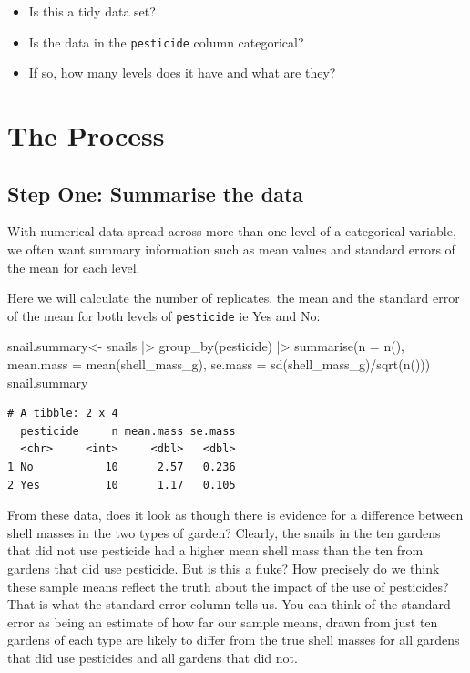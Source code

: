 \documentclass[
  letterpaper,
  DIV=11,
  numbers=noendperiod]{scrreprt}
\newenvironment{Shaded}{\begin{snugshade}}{\end{snugshade}}
\newcommand{\AttributeTok}[1]{\textcolor[rgb]{0.40,0.45,0.13}{#1}}
\newcommand{\FunctionTok}[1]{\textcolor[rgb]{0.28,0.35,0.67}{#1}}
\newcommand{\NormalTok}[1]{\textcolor[rgb]{0.00,0.23,0.31}{#1}}
\newcommand{\OtherTok}[1]{\textcolor[rgb]{0.00,0.23,0.31}{#1}}
\newcommand{\SpecialCharTok}[1]{\textcolor[rgb]{0.37,0.37,0.37}{#1}}
\providecommand{\tightlist}{%
  \setlength{\itemsep}{0pt}\setlength{\parskip}{0pt}}\usepackage{longtable,booktabs,array}
\begin{document}
\begin{itemize}
\tightlist
\item
  Is this a tidy data set?
\item
  Is the data in the \texttt{pesticide} column categorical?
\item
  If so, how many levels does it have and what are they?
\end{itemize}

\section{The Process}\label{the-process}

\subsection{Step One: Summarise the
data}\label{step-one-summarise-the-data}

With numerical data spread across more than one level of a categorical
variable, we often want summary information such as mean values and
standard errors of the mean for each level.

Here we will calculate the number of replicates, the mean and the
standard error of the mean for both levels of \texttt{pesticide} ie Yes
and No:

\begin{Shaded}
\begin{Highlighting}[]
\NormalTok{snail.summary}\OtherTok{\textless{}{-}}\NormalTok{ snails }\SpecialCharTok{|\textgreater{}}
\FunctionTok{group\_by}\NormalTok{(pesticide) }\SpecialCharTok{|\textgreater{}}
\FunctionTok{summarise}\NormalTok{(}\AttributeTok{n =} \FunctionTok{n}\NormalTok{(),}
          \AttributeTok{mean.mass =} \FunctionTok{mean}\NormalTok{(shell\_mass\_g),}
          \AttributeTok{se.mass =} \FunctionTok{sd}\NormalTok{(shell\_mass\_g)}\SpecialCharTok{/}\FunctionTok{sqrt}\NormalTok{(}\FunctionTok{n}\NormalTok{()))}
\NormalTok{snail.summary}
\end{Highlighting}
\end{Shaded}

\begin{verbatim}
# A tibble: 2 x 4
  pesticide     n mean.mass se.mass
  <chr>     <int>     <dbl>   <dbl>
1 No           10      2.57   0.236
2 Yes          10      1.17   0.105
\end{verbatim}

From these data, does it look as though there is evidence for a
difference between shell masses in the two types of garden? Clearly, the
snails in the ten gardens that did not use pesticide had a higher mean
shell mass than the ten from gardens that did use pesticide. But is this
a fluke? How precisely do we think these sample means reflect the truth
about the impact of the use of pesticides? That is what the standard
error column tells us. You can think of the standard error as being an
estimate of how far our sample means, drawn from just ten gardens of
each type are likely to differ from the true shell masses for all
gardens that did use pesticides and all gardens that did not.
\end{document}
